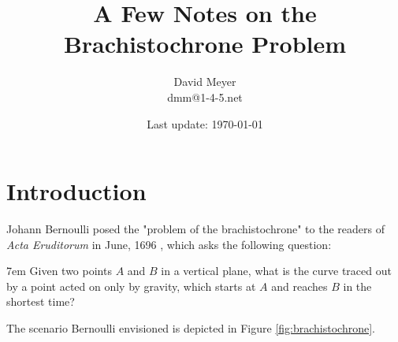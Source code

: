 \documentclass{article}
\title{A Few Notes on the Brachistochrone Problem}
\author{David Meyer \\ dmm@1-4-5.net}
\date{Last update: \today}                                                                           %
\theoremstyle{definition}
\begin{document}
\maketitle
%
%
%
\section{Introduction}
Johann Bernoulli posed the "problem of the brachistochrone" to the
readers of \emph{Acta Eruditorum} in June, 1696 \cite{1696acta}, 
which asks the following question:

\bigskip 
\begin{addmargin}[2em]{7em}                                                                             %
Given two points $A$ and $B$ in a vertical plane, what is the
curve traced out by a point acted on only by gravity, which
starts at $A$ and reaches $B$ in the shortest time?  
\end{addmargin}


\bigskip
\noindent
The scenario Bernoulli envisioned is depicted in Figure
\ref{fig:brachistochrone}. 
\end{document}
